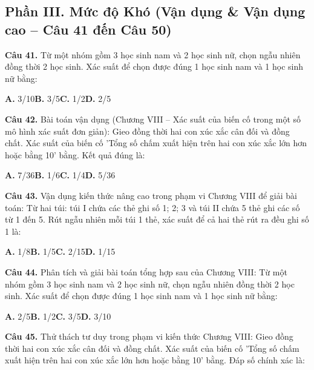 \documentclass[11pt,a4paper]{article}
\begin{document}
\subsection*{\color{accent} Phần III. Mức độ Khó (Vận dụng \& Vận dụng cao -- Câu 41 đến Câu 50)}
\textbf{\color{primary} Câu 41.} Từ một nhóm gồm 3 học sinh nam và 2 học sinh nữ, chọn ngẫu nhiên đồng thời 2 học sinh. Xác suất để chọn được đúng 1 học sinh nam và 1 học sinh nữ bằng:\par
\hspace*{1.5em}\textbf{A.} 3/10\quad\quad \textbf{B.} 3/5\quad\quad \textbf{C.} 1/2\quad\quad \textbf{D.} 2/5\par\vspace{2pt}
\textbf{\color{primary} Câu 42.} Bài toán vận dụng (Chương VIII – Xác suất của biến cố trong một số mô hình xác suất đơn giản): Gieo đồng thời hai con xúc xắc cân đối và đồng chất. Xác suất của biến cố 'Tổng số chấm xuất hiện trên hai con xúc xắc lớn hơn hoặc bằng 10' bằng. Kết quả đúng là:\par
\hspace*{1.5em}\textbf{A.} 7/36\quad\quad \textbf{B.} 1/6\quad\quad \textbf{C.} 1/4\quad\quad \textbf{D.} 5/36\par\vspace{2pt}
\textbf{\color{primary} Câu 43.} Vận dụng kiến thức nâng cao trong phạm vi Chương VIII để giải bài toán: Từ hai túi: túi I chứa các thẻ ghi số 1; 2; 3 và túi II chứa 5 thẻ ghi các số từ 1 đến 5. Rút ngẫu nhiên mỗi túi 1 thẻ, xác suất để cả hai thẻ rút ra đều ghi số 1 là:\par
\hspace*{1.5em}\textbf{A.} 1/8\quad\quad \textbf{B.} 1/5\quad\quad \textbf{C.} 2/15\quad\quad \textbf{D.} 1/15\par\vspace{2pt}
\textbf{\color{primary} Câu 44.} Phân tích và giải bài toán tổng hợp sau của Chương VIII: Từ một nhóm gồm 3 học sinh nam và 2 học sinh nữ, chọn ngẫu nhiên đồng thời 2 học sinh. Xác suất để chọn được đúng 1 học sinh nam và 1 học sinh nữ bằng:\par
\hspace*{1.5em}\textbf{A.} 2/5\quad\quad \textbf{B.} 1/2\quad\quad \textbf{C.} 3/5\quad\quad \textbf{D.} 3/10\par\vspace{2pt}
\textbf{\color{primary} Câu 45.} Thử thách tư duy trong phạm vi kiến thức Chương VIII: Gieo đồng thời hai con xúc xắc cân đối và đồng chất. Xác suất của biến cố 'Tổng số chấm xuất hiện trên hai con xúc xắc lớn hơn hoặc bằng 10' bằng. Đáp số chính xác là:\par
\end{document}
